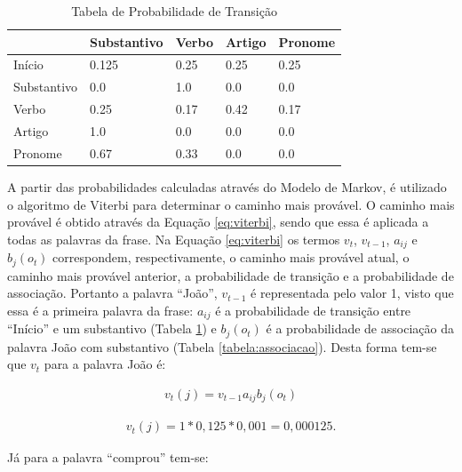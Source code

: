 \begin{table}[htb]
\centering
\begin{tabular}{|l|l|l|l|l|}
\hline
& Substantivo & Verbo & Artigo & Pronome \\ \hline
Início      & 0.125       & 0.25  & 0.25   & 0.25    \\ \hline
Substantivo & 0.0         & 1.0   & 0.0    & 0.0     \\ \hline
Verbo       & 0.25        & 0.17  & 0.42   & 0.17    \\ \hline
Artigo      & 1.0         & 0.0   & 0.0    & 0.0     \\ \hline
Pronome     & 0.67        & 0.33  & 0.0    & 0.0     \\ \hline
\end{tabular}
\caption{Tabela de Probabilidade de Transição}
\label{tabela:transicao}
\end{table}

A partir das probabilidades calculadas através do Modelo de Markov, é
utilizado o algoritmo de Viterbi para determinar o caminho mais provável. O
caminho mais provável é obtido através da Equação \ref{eq:viterbi}, sendo que
essa é aplicada a todas as palavras da frase. Na Equação \ref{eq:viterbi} os
termos $v_t$, $v_{t-1}$, $a_{ij}$ e $b_j(o_t)$ correspondem, respectivamente, o
caminho mais provável atual, o caminho mais provável anterior, a probabilidade
de transição e a probabilidade de associação.
Portanto a palavra ``João'', $v_{t-1}$ é representada pelo valor 1, visto
que essa é a primeira palavra da frase: $a_{ij}$ é a probabilidade de transição entre
``Início'' e um substantivo (Tabela \ref{tabela:transicao}) e $b_j(o_t)$ é a
probabilidade de associação da palavra João com substantivo (Tabela
\ref{tabela:associacao}). Desta forma tem-se que $v_t$ para a palavra João é:

\begin{equation}
\begin{split}
v_t(j) = v_{t-1} a_{ij} b_j(o_t)
\end{split}
\label{eq:viterbi}
\end{equation}



\begin{equation}
\begin{split}
v_t(j) = 1 * 0,125 * 0,001 = 0,000125.
\end{split}
\label{eq:joao}
\end{equation}

Já para a palavra ``comprou'' tem-se:

